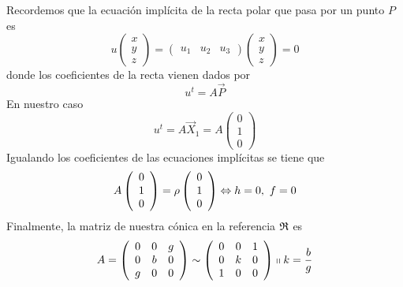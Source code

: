 Recordemos que la ecuación implícita de la recta polar que pasa por un punto $P$ es
\begin{equation*}
	u\left( \begin{array}{c}
	x\\y\\z
	\end{array}\right)=
	\begin{pmatrix}
	u_1 & u_2 & u_3
	\end{pmatrix}
	\left( \begin{array}{c}
	x\\y\\z
	\end{array}\right)=0
\end{equation*}
donde los coeficientes de la recta vienen dados por 
\begin{equation*}
	u^t=A\vec{P}
\end{equation*}
En nuestro caso
\begin{equation*}
u^t=A\vec{X}_1=A\left( \begin{array}{c}
	0\\1\\0
\end{array}\right)
\end{equation*}
Igualando los coeficientes de las ecuaciones implícitas se tiene que
\begin{equation*}
	A\left( \begin{array}{c}
	0\\1\\0
	\end{array}\right)=\rho \left( \begin{array}{c}
	0\\1\\0
	\end{array}\right)\Leftrightarrow h=0, \ f=0
\end{equation*}
Finalmente, la matriz de nuestra cónica en la referencia $\mathfrak{R}$ es
\begin{equation*}
	A=\left( \begin{array}{ccc}
		0 & 0 & g\\
		0 & b & 0\\
		g & 0 & 0
	\end{array}\right) \sim 
	\left( \begin{array}{ccc}
		0 & 0 & 1\\
		0 & k & 0\\
		1 & 0 & 0
	\end{array}\right) \shortparallel k=\frac{b}{g}
\end{equation*}

